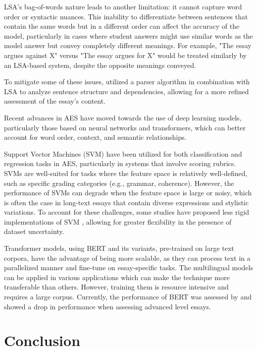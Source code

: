 \documentclass{article}
\begin{document}
	LSA’s bag-of-words nature leads to another limitation: it cannot capture word order or syntactic nuances. This inability to differentiate between sentences that contain the same words but in a different order can affect the accuracy of the model, particularly in cases where student answers might use similar words as the model answer but convey completely different meanings. For example, "The essay argues against X" versus "The essay argues for X" would be treated similarly by an LSA-based system, despite the opposite meanings conveyed.
	
	To mitigate some of these issues, \textcite{26_alsanie2022threelevels} utilized a parser algorithm in combination with LSA to analyze sentence structure and dependencies, allowing for a more refined assessment of the essay’s content.
	
	Recent advances in AES have moved towards the use of deep learning models, particularly those based on neural networks and transformers, which can better account for word order, context, and semantic relationships. 
	
	Support Vector Machines (SVM) have been utilized for both classification and regression tasks in AES, particularly in systems that involve scoring rubrics. SVMs are well-suited for tasks where the feature space is relatively well-defined, such as specific grading categories (e.g., grammar, coherence). However, the performance of SVMs can degrade when the feature space is large or noisy, which is often the case in long-text essays that contain diverse expressions and stylistic variations. To account for these challenges, some studies have proposed less rigid implementations of SVM \cite{17_abbas2015svm}, allowing for greater flexibility in the presence of dataset uncertainty.
	
	Transformer models, using BERT and its variants, pre-trained on large text corpora, have the advantage of being more scalable, as they can process text in a parallelized manner and fine-tune on essay-specific tasks. The multilingual models can be applied in various applications which can make the technique more transferable than others. However, training them is resource intensive and requires a large corpus. Currently, the performance of BERT was assessed by \textcite{9_firoozi2024bert} and showed a drop in performance when assessing advanced level essays. 
	
	\section{Conclusion}
	
\end{document}
